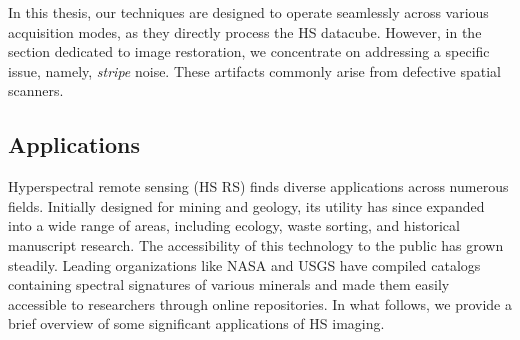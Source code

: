 In this thesis, our techniques are designed to operate seamlessly across various acquisition modes, as they directly process the HS datacube.
However, in the section dedicated to image restoration, we concentrate on addressing a specific issue, namely, \emph{stripe} noise.
These artifacts commonly arise from defective spatial scanners.


\subsection{Applications}

Hyperspectral remote sensing (HS RS) finds diverse applications across numerous fields.
Initially designed for mining and geology, its utility has since expanded into a wide range of areas, including ecology, waste sorting, and historical manuscript research.
The accessibility of this technology to the public has grown steadily.
Leading organizations like NASA and USGS have compiled catalogs containing spectral signatures of various minerals and made them easily accessible to researchers through online repositories.
In what follows, we provide a brief overview of some significant applications of HS imaging.

